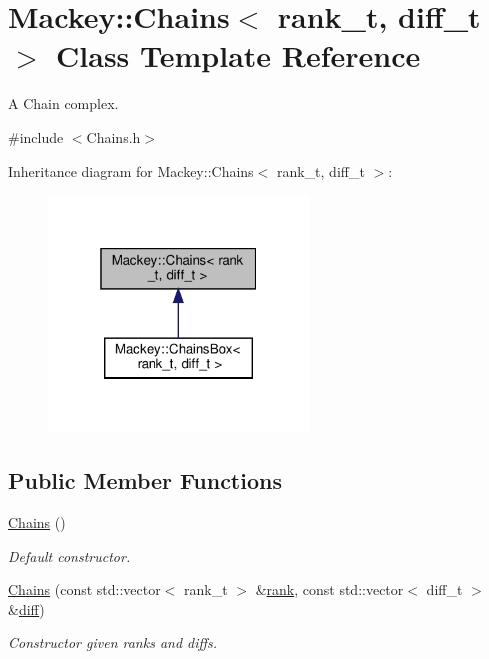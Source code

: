 \hypertarget{classMackey_1_1Chains}{}\section{Mackey\+:\+:Chains$<$ rank\+\_\+t, diff\+\_\+t $>$ Class Template Reference}
\label{classMackey_1_1Chains}


A Chain complex.  




{\ttfamily \#include $<$Chains.\+h$>$}



Inheritance diagram for Mackey\+:\+:Chains$<$ rank\+\_\+t, diff\+\_\+t $>$\+:\nopagebreak
\begin{figure}[H]
\begin{center}
\leavevmode
\includegraphics[width=196pt]{classMackey_1_1Chains__inherit__graph}
\end{center}
\end{figure}
\subsection*{Public Member Functions}
\begin{DoxyCompactItemize}
\item 
\hyperlink{classMackey_1_1Chains_ade226a800be59b53f1f1850e0753dbcb}{Chains} ()
\begin{DoxyCompactList}\small\item\em Default constructor. \end{DoxyCompactList}\item 
\hyperlink{classMackey_1_1Chains_a23e36ad0f810adeecad83b87b7034335}{Chains} (const std\+::vector$<$ rank\+\_\+t $>$ \&\hyperlink{classMackey_1_1Chains_ad041dff6f210ae5be4de0a3b076a4d95}{rank}, const std\+::vector$<$ diff\+\_\+t $>$ \&\hyperlink{classMackey_1_1Chains_a9ccee2cbb3daa1e82bab920aeef59516}{diff})
\begin{DoxyCompactList}\small\item\em Constructor given ranks and diffs. \end{DoxyCompactList}\end{DoxyCompactItemize}
